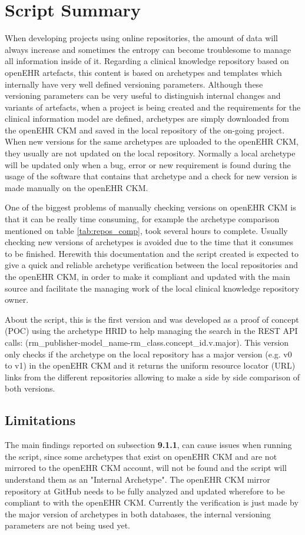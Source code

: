 \documentclass[mim_thesis.tex]{subfiles}
\begin{document}
\section{Script Summary}
When developing projects using online repositories, the amount of data will always increase and sometimes the entropy can become troublesome to manage all information inside of it. Regarding a clinical knowledge repository based on openEHR artefacts, this content is based on 
archetypes and templates which internally have very well defined versioning parameters. Although these versioning parameters can be very useful to distinguish internal changes and variants of artefacts, when a project is being created and the requirements for the clinical information model are defined, archetypes are simply downloaded from the openEHR CKM and saved in the local repository of the on-going project. When new versions for the same archetypes are uploaded to the openEHR CKM, they usually are not updated on the local repository. Normally a local archetype will be updated only when a bug, error or new requirement is found during the usage of the software that contains that archetype and a check for new version is made manually on the openEHR CKM. 

One of the biggest problems of manually checking versions on openEHR 
CKM is that it can be really time consuming, for example the archetype comparison mentioned on table \ref{tab:repos_comp}, took several hours to complete. Usually checking new versions of archetypes is avoided due to the time that it consumes to be finished. Herewith this documentation and the script created is expected to give a quick and reliable archetype verification between the local repositories and the openEHR CKM, in order to make it compliant and updated with the main source and facilitate the managing work of the local clinical knowledge repository owner. 

About the script, this is the first version and was developed as a proof of concept (POC) using the archetype HRID to help managing the search in the REST API calls: (rm\_publisher-model\_name-rm\_class.concept\_id.v.major). This version only checks if the archetype on the local repository has a major version (e.g. v0 to v1) in the openEHR CKM and it returns the uniform resource locator (URL) links from the different repositories allowing to make a side by side comparison of both versions. 

\subsection{Limitations}
The main findings reported on subsection \textbf{9.1.1}, can cause issues when running the script, since some archetypes that exist on openEHR CKM and are not mirrored to the openEHR CKM account, will not be found and the script will understand them as an "Internal Archetype". The openEHR CKM mirror repository at GitHub needs to be fully analyzed and updated wherefore to be compliant to with the openEHR CKM. Currently the verification is just made by the major version of archetypes in both databases, the internal versioning parameters are not being used yet.
\end{document}
